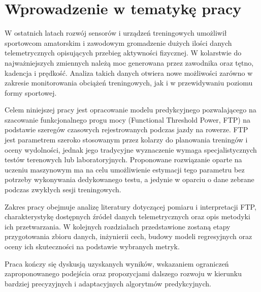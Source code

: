 \chapter{Wprowadzenie w tematykę pracy}

W ostatnich latach rozwój sensorów i urządzeń treningowych umożliwił sportowcom amatorskim i zawodowym gromadzenie dużych ilości danych telemetrycznych opisujących przebieg aktywności fizycznej. W kolarstwie do najważniejszych zmiennych należą moc generowana przez zawodnika oraz tętno, kadencja i prędkość. Analiza takich danych otwiera nowe możliwości zarówno w zakresie monitorowania obciążeń treningowych, jak i w przewidywaniu poziomu formy sportowej.

Celem niniejszej pracy jest opracowanie modelu predykcyjnego pozwalającego na szacowanie funkcjonalnego progu mocy (Functional Threshold Power, FTP) na podstawie szeregów czasowych rejestrowanych podczas jazdy na rowerze. FTP jest parametrem szeroko stosowanym przez kolarzy do planowania treningów i oceny wydolności, jednak jego tradycyjne wyznaczenie wymaga specjalistycznych testów terenowych lub laboratoryjnych. Proponowane rozwiązanie oparte na uczeniu maszynowym ma na celu umożliwienie estymacji tego parametru bez potrzeby wykonywania dedykowanego testu, a jedynie w oparciu o dane zebrane podczas zwykłych sesji treningowych.

Zakres pracy obejmuje analizę literatury dotyczącej pomiaru i interpretacji FTP, charakterystykę dostępnych źródeł danych telemetrycznych oraz opis metodyki ich przetwarzania. W kolejnych rozdziałach przedstawione zostaną etapy przygotowania zbioru danych, inżynierii cech, budowy modeli regresyjnych oraz oceny ich skuteczności na podstawie wybranych metryk.

Praca kończy się dyskusją uzyskanych wyników, wskazaniem ograniczeń zaproponowanego podejścia oraz propozycjami dalszego rozwoju w kierunku bardziej precyzyjnych i adaptacyjnych algorytmów predykcyjnych.
